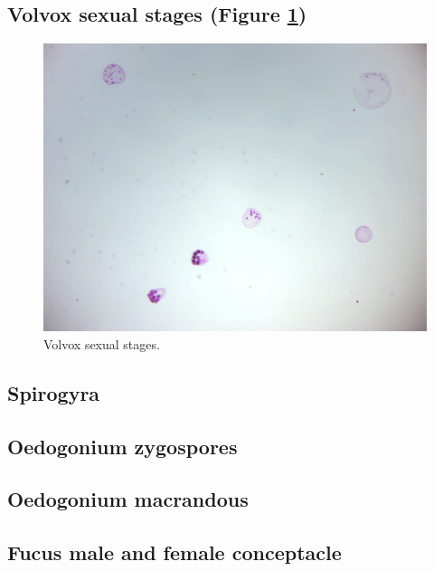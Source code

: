 \subsection{Volvox sexual stages (Figure
\ref{fig:volvoxsex})}\label{volvox-sexual-stages-figure-reffigvolvoxsex}

\begin{figure}

{\centering \includegraphics[width=0.7\linewidth]{./figures/protists/volvox_sex}

}

\caption{Volvox sexual stages.}\label{fig:volvoxsex}
\end{figure}

\subsection{Spirogyra}\label{spirogyra-1}

\subsection{Oedogonium zygospores}\label{oedogonium-zygospores}

\subsection{Oedogonium macrandous}\label{oedogonium-macrandous}

\subsection{Fucus male and female
conceptacle}\label{fucus-male-and-female-conceptacle}

